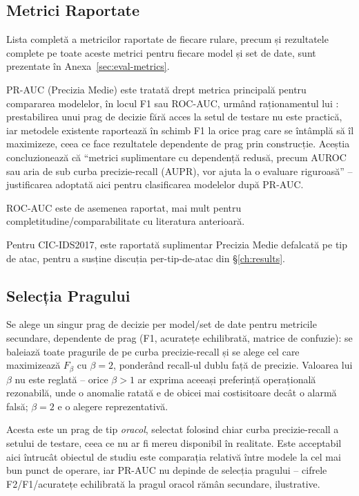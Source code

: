 \subsection{Metrici Raportate}

Lista completă a metricilor raportate de fiecare rulare, precum și rezultatele complete pe toate aceste metrici pentru fiecare model și set de date, sunt prezentate în Anexa~\ref{sec:eval-metrics}.

PR-AUC (Precizia Medie) este tratată drept metrica principală pentru compararea modelelor, în locul F1 sau ROC-AUC, urmând raționamentul lui \textcite{kim2022rigorous}: prestabilirea unui prag de decizie fără acces la setul de testare nu este practică, iar metodele existente raportează în schimb F1 la orice prag care se întâmplă să îl maximizeze, ceea ce face rezultatele dependente de prag prin construcție. Aceștia concluzionează că \enquote{metrici suplimentare cu dependență redusă, precum AUROC sau aria de sub curba precizie-recall (AUPR), vor ajuta la o evaluare riguroasă} -- justificarea adoptată aici pentru clasificarea modelelor după PR-AUC.

ROC-AUC este de asemenea raportat, mai mult pentru completitudine/comparabilitate cu literatura anterioară.

Pentru CIC-IDS2017, este raportată suplimentar Precizia Medie defalcată pe tip de atac, pentru a susține discuția per-tip-de-atac din \S\ref{ch:results}.

\subsection{Selecția Pragului}

Se alege un singur prag de decizie per model/set de date pentru metricile secundare, dependente de prag (F1, acuratețe echilibrată, matrice de confuzie): se baleiază toate pragurile de pe curba precizie-recall și se alege cel care maximizează $F_\beta$ cu $\beta=2$, ponderând recall-ul dublu față de precizie. Valoarea lui $\beta$ nu este reglată -- orice $\beta>1$ ar exprima aceeași preferință operațională rezonabilă, unde o anomalie ratată e de obicei mai costisitoare decât o alarmă falsă; $\beta=2$ e o alegere reprezentativă.

Acesta este un prag de tip \emph{oracol}, selectat folosind chiar curba precizie-recall a setului de testare, ceea ce nu ar fi mereu disponibil în realitate. Este acceptabil aici întrucât obiectul de studiu este comparația relativă între modele la cel mai bun punct de operare, iar PR-AUC nu depinde de selecția pragului -- cifrele F2/F1/acuratețe echilibrată la pragul oracol rămân secundare, ilustrative.

